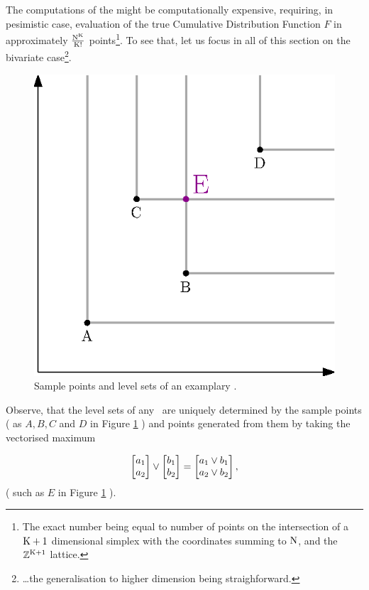 The computations of the \KS might be computationally expensive, requiring, in pesimistic case, evaluation of the true Cumulative Distribution Function $F$ in approximately $\frac{\mathrm{N}^{\mathrm{K}}}{\mathrm{K}!}$ points\footnote{The exact number being equal to number of points on the intersection of a $\mathrm{K}+1$ dimensional simplex with the coordinates summing to $\mathrm{N}$, and the $\mathbb{Z}^{\mathrm{K}+1}$ lattice.}. To see that, let us focus in all of this section on the bivariate case\footnote{\dots the generalisation to higher dimension being straighforward.}.   


\begin{figure}
	\centering \includegraphics[scale=1]{./img/KS1.eps}
	\caption{Sample points and level sets of an examplary \ecdf.}\label{simpleEcdf}
\end{figure}


Observe, that the level sets of any \ecdf\, are uniquely determined by the sample points ( as $A, B, C$ and $D$ in Figure \ref{simpleEcdf} ) and points generated from them by taking the vectorised maximum

$$ 
	\begin{bmatrix} a_1 \cr a_2 \end{bmatrix} \vee 
	\begin{bmatrix} b_1 \cr b_2 \end{bmatrix} = 
	\begin{bmatrix} a_1 \vee b_1 \cr a_2 \vee b_2 \end{bmatrix},
$$ 
( such as $E$ in Figure \ref{simpleEcdf} ).  

